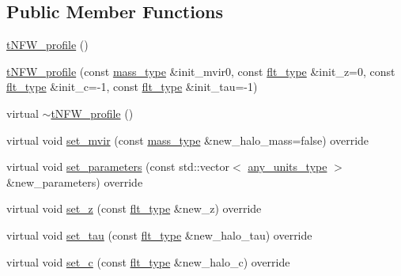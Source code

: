 \subsection*{Public Member Functions}
\begin{DoxyCompactItemize}
\item 
\hyperlink{classIceBRG_1_1tNFW__profile_ae0daa0942c5f26a60ea5376c7bbbf8a3}{t\+N\+F\+W\+\_\+profile} ()
\item 
\hyperlink{classIceBRG_1_1tNFW__profile_a513f0492cf5d3391ebabdd0585f7eff1}{t\+N\+F\+W\+\_\+profile} (const \hyperlink{namespaceIceBRG_a1be72ac4918a9b029f2eefa084213e35}{mass\+\_\+type} \&init\+\_\+mvir0, const \hyperlink{lib_2IceBRG__main_2common_8h_ad0f130a56eeb944d9ef2692ee881ecc4}{flt\+\_\+type} \&init\+\_\+z=0, const \hyperlink{lib_2IceBRG__main_2common_8h_ad0f130a56eeb944d9ef2692ee881ecc4}{flt\+\_\+type} \&init\+\_\+c=-\/1, const \hyperlink{lib_2IceBRG__main_2common_8h_ad0f130a56eeb944d9ef2692ee881ecc4}{flt\+\_\+type} \&init\+\_\+tau=-\/1)
\item 
virtual \hyperlink{classIceBRG_1_1tNFW__profile_a40267497dbb33ec3fc33095e91714154}{$\sim$t\+N\+F\+W\+\_\+profile} ()
\item 
virtual void \hyperlink{classIceBRG_1_1tNFW__profile_ab2a95dcaff2589e25d4892267fe765ce}{set\+\_\+mvir} (const \hyperlink{namespaceIceBRG_a1be72ac4918a9b029f2eefa084213e35}{mass\+\_\+type} \&new\+\_\+halo\+\_\+mass=false) override
\item 
virtual void \hyperlink{classIceBRG_1_1tNFW__profile_a80de1f502ac7deb9d8d993564fefb5cd}{set\+\_\+parameters} (const std\+::vector$<$ \hyperlink{namespaceIceBRG_a3101fc159e191fa99c4ec14e445df96e}{any\+\_\+units\+\_\+type} $>$ \&new\+\_\+parameters) override
\item 
virtual void \hyperlink{classIceBRG_1_1tNFW__profile_a4bfeb583dee286c98a14b826f912684a}{set\+\_\+z} (const \hyperlink{lib_2IceBRG__main_2common_8h_ad0f130a56eeb944d9ef2692ee881ecc4}{flt\+\_\+type} \&new\+\_\+z) override
\item 
virtual void \hyperlink{classIceBRG_1_1tNFW__profile_ae17b380bde747f52bd09ccd9137b8f80}{set\+\_\+tau} (const \hyperlink{lib_2IceBRG__main_2common_8h_ad0f130a56eeb944d9ef2692ee881ecc4}{flt\+\_\+type} \&new\+\_\+halo\+\_\+tau) override
\item 
virtual void \hyperlink{classIceBRG_1_1tNFW__profile_a1bfe72b182d4794a16bdd827ad5bcd79}{set\+\_\+c} (const \hyperlink{lib_2IceBRG__main_2common_8h_ad0f130a56eeb944d9ef2692ee881ecc4}{flt\+\_\+type} \&new\+\_\+halo\+\_\+c) override
\item 

\end{DoxyCompactItemize}
